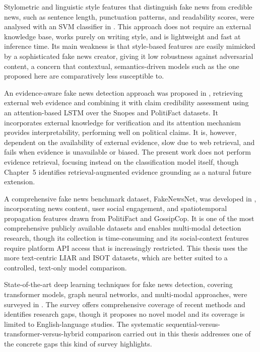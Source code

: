 Stylometric and linguistic style features that distinguish fake news from credible news, such as sentence length, punctuation patterns, and readability scores, were analysed with an SVM classifier in \citep{Przybyla2020Capturing}. This approach does not require an external knowledge base, works purely on writing style, and is lightweight and fast at inference time. Its main weakness is that style-based features are easily mimicked by a sophisticated fake news creator, giving it low robustness against adversarial content, a concern that contextual, semantics-driven models such as the one proposed here are comparatively less susceptible to.

An evidence-aware fake news detection approach was proposed in \citep{Popat2019DeClarE}, retrieving external web evidence and combining it with claim credibility assessment using an attention-based LSTM over the Snopes and PolitiFact datasets. It incorporates external knowledge for verification and its attention mechanism provides interpretability, performing well on political claims. It is, however, dependent on the availability of external evidence, slow due to web retrieval, and fails when evidence is unavailable or biased. The present work does not perform evidence retrieval, focusing instead on the classification model itself, though Chapter~5 identifies retrieval-augmented evidence grounding as a natural future extension.

A comprehensive fake news benchmark dataset, FakeNewsNet, was developed in \citep{Shu2020FakeNewsNet}, incorporating news content, user social engagement, and spatiotemporal propagation features drawn from PolitiFact and GossipCop. It is one of the most comprehensive publicly available datasets and enables multi-modal detection research, though its collection is time-consuming and its social-context features require platform API access that is increasingly restricted. This thesis uses the more text-centric LIAR and ISOT datasets, which are better suited to a controlled, text-only model comparison.

State-of-the-art deep learning techniques for fake news detection, covering transformer models, graph neural networks, and multi-modal approaches, were surveyed in \citep{Mehta2022RecentTrends}. The survey offers comprehensive coverage of recent methods and identifies research gaps, though it proposes no novel model and its coverage is limited to English-language studies. The systematic sequential-versus-transformer-versus-hybrid comparison carried out in this thesis addresses one of the concrete gaps this kind of survey highlights.

